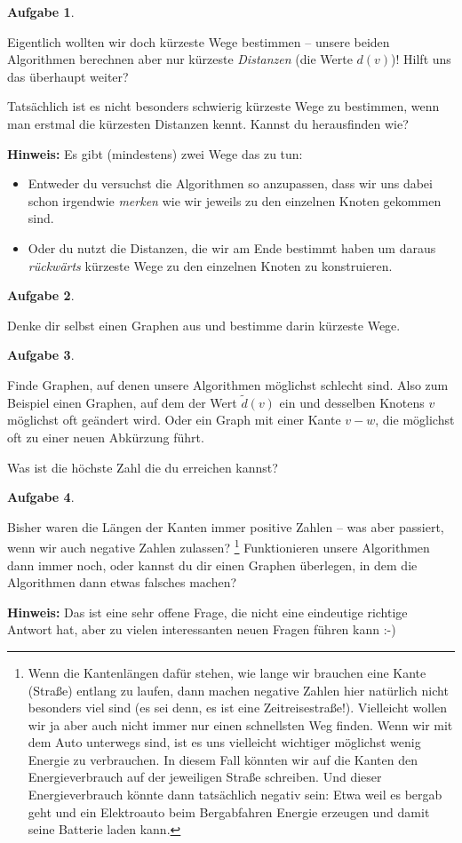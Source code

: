 \documentclass[a4paper,ngerman,12pt]{scrartcl}
\theoremstyle{definition}
\newtheorem{aufg}{Aufgabe}
\newenvironment{aufgabe}[1][]
		{\begin{shaded}\vspace{-0.3cm}\begin{aufg}\emph{#1} \par\medskip}
		{\end{aufg}\vspace{-0.3cm}\end{shaded}}
\theoremstyle{plain}
\theoremstyle{remark}
\newcommand{\kante}[2]{#1{-}#2}
\begin{document}
\newpage

\begin{aufgabe}
	Eigentlich wollten wir doch kürzeste Wege bestimmen -- unsere beiden Algorithmen berechnen aber nur kürzeste \emph{Distanzen} (die Werte $d(v)$)! Hilft uns das überhaupt weiter?
	
	Tatsächlich ist es nicht besonders schwierig kürzeste Wege zu bestimmen, wenn man erstmal die kürzesten Distanzen kennt. Kannst du herausfinden wie?
	
	\textbf{Hinweis:} Es gibt (mindestens) zwei Wege das zu tun:
	\begin{itemize}
		\item Entweder du versuchst die Algorithmen so anzupassen, dass wir uns dabei schon irgendwie \emph{merken} wie wir jeweils zu den einzelnen Knoten gekommen sind.
		\item Oder du nutzt die Distanzen, die wir am Ende bestimmt haben um daraus \emph{rückwärts} kürzeste Wege zu den einzelnen Knoten zu konstruieren.
	\end{itemize}
\end{aufgabe}

\begin{aufgabe}
	Denke dir selbst einen Graphen aus und bestimme darin kürzeste Wege.
\end{aufgabe}

\begin{aufgabe}
	Finde Graphen, auf denen unsere Algorithmen möglichst schlecht sind. Also zum Beispiel einen Graphen, auf dem der Wert $\tilde{d}(v)$ ein und desselben Knotens $v$ möglichst oft geändert wird. Oder ein Graph mit einer Kante $\kante{v}{w}$, die möglichst oft zu einer neuen Abkürzung führt.
	
	Was ist die höchste Zahl die du erreichen kannst?
\end{aufgabe}

\begin{aufgabe}
	Bisher waren die Längen der Kanten immer positive Zahlen -- was aber passiert, wenn wir auch negative Zahlen zulassen?
	\footnote{Wenn die Kantenlängen dafür stehen, wie lange wir brauchen eine Kante (Straße) entlang zu laufen, dann machen negative Zahlen hier natürlich nicht besonders viel sind (es sei denn, es ist eine Zeitreisestraße!). Vielleicht wollen wir ja aber auch nicht immer nur einen schnellsten Weg finden. Wenn wir mit dem Auto unterwegs sind, ist es uns vielleicht wichtiger möglichst wenig Energie zu verbrauchen. In diesem Fall könnten wir auf die Kanten den Energieverbrauch auf der jeweiligen Straße schreiben. Und dieser Energieverbrauch könnte dann tatsächlich negativ sein: Etwa weil es bergab geht und ein Elektroauto beim Bergabfahren Energie erzeugen und damit seine Batterie laden kann.}
	Funktionieren unsere Algorithmen dann immer noch, oder kannst du dir einen Graphen überlegen, in dem die Algorithmen dann etwas falsches machen?
	
	\textbf{Hinweis:} Das ist eine sehr offene Frage, die nicht eine eindeutige richtige Antwort hat, aber zu vielen interessanten neuen Fragen führen kann :-)
\end{aufgabe}
\end{document}
